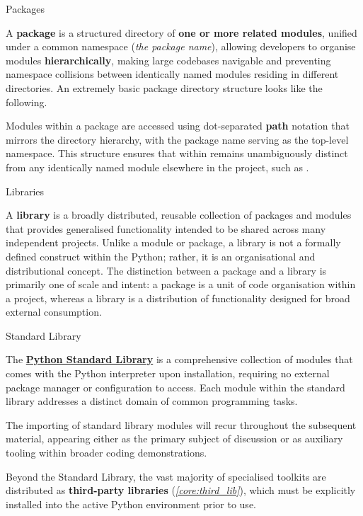 \documentclass[10pt]{article}
\begin{document}
  \begin{core}{Packages}

    A \textbf{package} is a structured directory of \textbf{one or more related modules}, unified under a common namespace (\textit{the package name}), allowing developers to organise modules \textbf{hierarchically}, making large codebases navigable and preventing namespace collisions between identically named modules residing in different directories. An extremely basic package directory structure looks like the following.


    Modules within a package are accessed using dot-separated \textbf{path} notation that mirrors the directory hierarchy, with the package name serving as the top-level namespace. This structure ensures that  within  remains unambiguously distinct from any identically named module elsewhere in the project, such as .

  \end{core}

  \begin{core}[label=core:libraries]{Libraries}

    A \textbf{library} is a broadly distributed, reusable collection of packages and modules that provides generalised functionality intended to be shared across many independent projects. Unlike a module or package, a library is not a formally defined construct within the Python; rather, it is an organisational and distributional concept. The distinction between a package and a library is primarily one of scale and intent: a package is a unit of code organisation within a project, whereas a library is a distribution of functionality designed for broad external consumption.

  \end{core}

  \begin{core}[label=core:standard_library]{Standard Library}

    The \href{https://docs.python.org/3/py-modindex.html}{\textbf{Python Standard Library}} is a comprehensive collection of modules that comes with the Python interpreter upon installation, requiring no external package manager or configuration to access. Each module within the standard library addresses a distinct domain of common programming tasks.

    The importing of standard library modules will recur throughout the subsequent material, appearing either as the primary subject of discussion or as auxiliary tooling within broader coding demonstrations.

    Beyond the Standard Library, the vast majority of specialised toolkits are distributed as \textbf{third-party libraries} (\textit{\autoref{core:third_lib}}), which must be explicitly installed into the active Python environment prior to use.

  \end{core}
\end{document}
